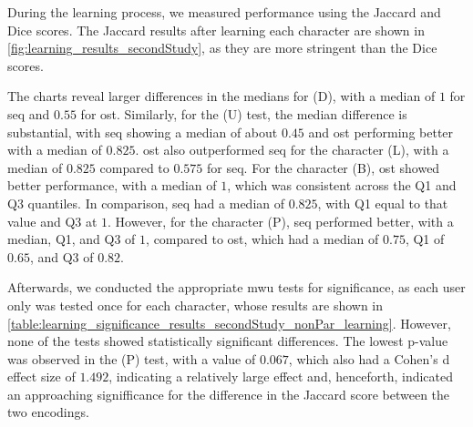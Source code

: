 During the learning process, we measured performance using the Jaccard and Dice scores. The Jaccard results after learning each character are shown in \autoref{fig:learning_results_secondStudy}, as they are more stringent than the Dice scores.

The charts reveal larger differences in the medians for (D), with a median of $1$ for \gls{seq} and $0.55$ for \gls{ost}.
Similarly, for the (U) test, the median difference is substantial, with \gls{seq} showing a median of about $0.45$ and \gls{ost} performing better with a median of $0.825$.
\gls{ost} also outperformed \gls{seq} for the character (L), with a median of $0.825$ compared to $0.575$ for \gls{seq}.
For the character (B), \gls{ost} showed better performance, with a median of $1$, which was consistent across the Q1 and Q3 quantiles. In comparison, \gls{seq} had a median of $0.825$, with Q1 equal to that value and Q3 at $1$.
However, for the character (P), \gls{seq} performed better, with a median, Q1, and Q3 of $1$, compared to \gls{ost}, which had a median of $0.75$, Q1 of $0.65$, and Q3 of $0.82$.

Afterwards, we conducted the appropriate \gls{mwu} tests for significance, as each user only was tested once for each character, whose results are shown in \autoref{table:learning_significance_results_secondStudy_nonPar_learning}.
However, none of the tests showed statistically significant differences.
The lowest p-value was observed in the (P) test, with a value of $0.067$, which also had a Cohen's d effect size of $1.492$, indicating a relatively large effect and, henceforth, indicated an approaching signifficance for the difference in the Jaccard score between the two encodings.

\begin{table}[ht]
\caption{Results of the \gls{mwu} tests for significance grouped by the different Braille characters during training for the different Encodings with Cohen's d.}
\label{table:learning_significance_results_secondStudy_nonPar_learning}
\end{table}

